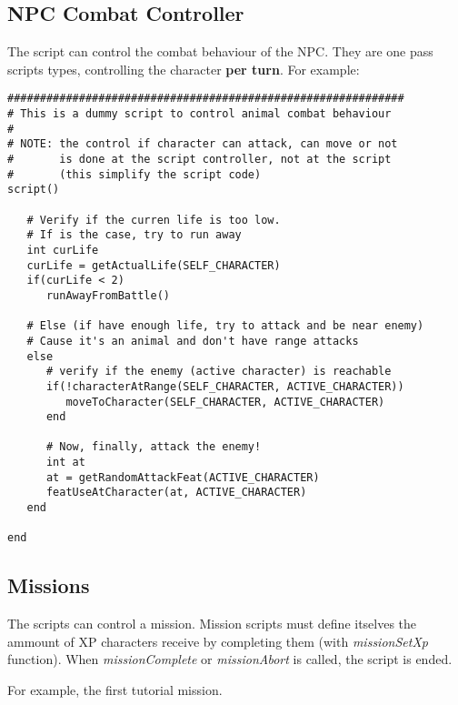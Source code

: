 \documentclass[ letterpaper,12pt]{article}
\begin{document}
\subsection{NPC Combat Controller}
The script can control the combat behaviour of the NPC. They are one pass
scripts types, controlling the character {\bf per turn}. For example:

\begin{verbatim}
#############################################################
# This is a dummy script to control animal combat behaviour
#
# NOTE: the control if character can attack, can move or not
#       is done at the script controller, not at the script
#       (this simplify the script code)
script()

   # Verify if the curren life is too low.
   # If is the case, try to run away
   int curLife
   curLife = getActualLife(SELF_CHARACTER)
   if(curLife < 2)
      runAwayFromBattle()

   # Else (if have enough life, try to attack and be near enemy)
   # Cause it's an animal and don't have range attacks
   else
      # verify if the enemy (active character) is reachable
      if(!characterAtRange(SELF_CHARACTER, ACTIVE_CHARACTER))
         moveToCharacter(SELF_CHARACTER, ACTIVE_CHARACTER)
      end

      # Now, finally, attack the enemy!
      int at
      at = getRandomAttackFeat(ACTIVE_CHARACTER)
      featUseAtCharacter(at, ACTIVE_CHARACTER)
   end

end
\end{verbatim}

\subsection{Missions}

The scripts can control a mission. Mission scripts must define itselves the
ammount of XP characters receive by completing them (with {\it missionSetXp}
function). When {\it missionComplete} or {\it missionAbort} is called, the
script is ended. 

For example, the first tutorial mission.
\end{document}
